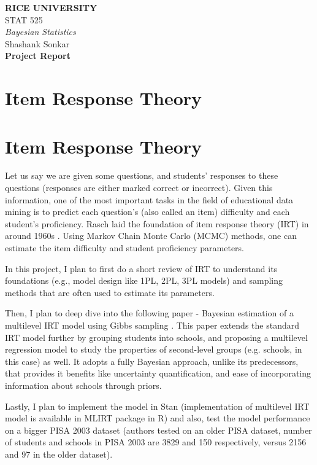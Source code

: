 \documentclass[12pt]{article}
\begin{document}
\begin{center}
{\bf RICE UNIVERSITY} \\
STAT 525 \\
{\it Bayesian Statistics} \\ 
\vspace{5pt}
Shashank Sonkar \\
\vspace{11pt}
{\bf Project Report}
\end{center}

\section{Item Response Theory}


\section{Item Response Theory}
Let us say we are given some questions, and students' responses to these questions (responses are either marked correct or incorrect). Given this information, one of the most important tasks in the field of educational data mining is to predict each question's (also called an item) difficulty and each student's proficiency. Rasch laid the foundation of item response theory (IRT) in around 1960s \cite{rasch1960probabilistic,rasch1966item}. Using Markov Chain Monte Carlo (MCMC) methods, one can estimate the item difficulty and student proficiency parameters.

In this project, I plan to first do a short review of IRT to understand its foundations (e.g., model design like 1PL, 2PL, 3PL models) and sampling methods that are often used to estimate its parameters.

Then, I plan to deep dive into the following paper - Bayesian estimation of a multilevel IRT model using Gibbs sampling \cite{fox2001bayesian}. This paper extends the standard IRT model further by grouping students into schools, and proposing a multilevel regression model to study the properties of second-level groups (e.g. schools, in this case) as well. It adopts a fully Bayesian approach, unlike its predecessors, that provides it benefits like uncertainty quantification, and ease of incorporating information about schools through priors.

Lastly, I plan to implement the model in Stan (implementation of multilevel IRT model is available in MLIRT package in R) and also, test the model performance on a bigger PISA 2003 dataset (authors tested on an older PISA dataset, number of students and schools in PISA 2003 are 3829 and 150 respectively, versus 2156 and 97 in the older dataset).
\end{document}
